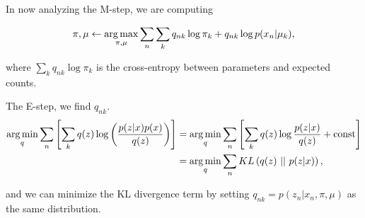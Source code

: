 \documentclass{article}
\begin{document}
\smallskip

In now analyzing the M-step, we are computing 

\begin{align*}
\pi, \mu \gets \argmax_{\pi, \mu} \sum_n \sum_k q_{nk} \log \pi_k + q_{nk} \log p(x_n |  \mu_k),
\end{align*}

where $\displaystyle \sum_k q_{nk} \log \pi_k$ is the cross-entropy between parameters and expected counts.

The E-step, we find $q_{nk}$.  
\begin{align*}
\argmin_{q} \sum_{n} \left[ \sum_k q(z) \log \left(\frac{p(z|x) p(x)}{q(z)} \right) \right]	&= \argmin_q \sum_{n} \left[ \sum_k q(z) \log \frac{p(z|x)}{q(z)} + \text{const} \right] \\
&= \argmin_q \sum_n KL\left( q(z)\ ||\ p(z|x) \right),
\end{align*}

and we can minimize the KL divergence term by setting $q_{nk} = p(z_n | x_n, \pi,\mu)$ as the same distribution.
\end{document}
